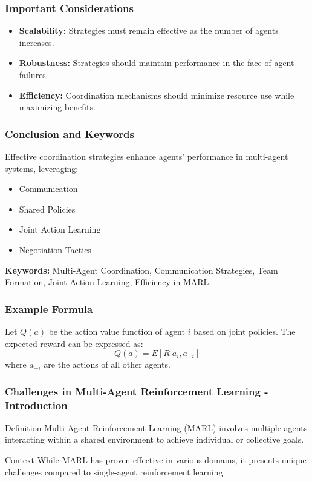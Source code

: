 \documentclass[aspectratio=169]{beamer}
\begin{document}
\begin{frame}[fragile]
    \frametitle{Important Considerations}
    \begin{itemize}
        \item \textbf{Scalability:} Strategies must remain effective as the number of agents increases.
        \item \textbf{Robustness:} Strategies should maintain performance in the face of agent failures.
        \item \textbf{Efficiency:} Coordination mechanisms should minimize resource use while maximizing benefits.
    \end{itemize}
\end{frame}

\begin{frame}[fragile]
    \frametitle{Conclusion and Keywords}
    Effective coordination strategies enhance agents' performance in multi-agent systems, leveraging:
    \begin{itemize}
        \item Communication
        \item Shared Policies
        \item Joint Action Learning
        \item Negotiation Tactics
    \end{itemize}
    
    \textbf{Keywords:} Multi-Agent Coordination, Communication Strategies, Team Formation, Joint Action Learning, Efficiency in MARL.
\end{frame}

\begin{frame}[fragile]
    \frametitle{Example Formula}
    Let \( Q(a) \) be the action value function of agent \( i \) based on joint policies. The expected reward can be expressed as:
    \begin{equation}
        Q(a) = E[R | a_i, a_{-i}]
    \end{equation}
    where \( a_{-i} \) are the actions of all other agents.
\end{frame}

\begin{frame}[fragile]
    \frametitle{Challenges in Multi-Agent Reinforcement Learning - Introduction}
    \begin{block}{Definition}
        Multi-Agent Reinforcement Learning (MARL) involves multiple agents interacting within a shared environment to achieve individual or collective goals.
    \end{block}
    \begin{block}{Context}
        While MARL has proven effective in various domains, it presents unique challenges compared to single-agent reinforcement learning.
    \end{block}
\end{frame}
\end{document}
